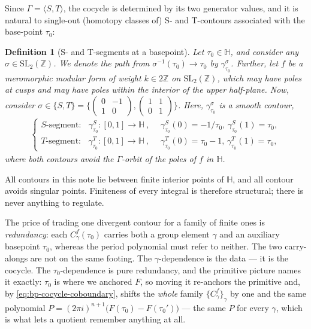 \documentclass[11pt]{article}
\newtheorem{definition}[theorem]{Definition}
\numberwithin{equation}{section}  %
\newcommand{\HH}{\mathbb{H}}
\newcommand{\ZZ}{\mathbb{Z}}
\newcommand{\SLZ}{\mathrm{SL}_2(\ZZ)}
\begin{document}
Since $\Gamma = \langle S, T\rangle$, the cocycle is determined by its two
generator values, and it is natural to single-out (homotopy classes of) S- and T-contours associated with 
the base-point $\tau_0$:%
 
\begin{definition}[S- and T-segments at a basepoint]\label{def:contours}
Let $\tau_0 \in \HH$, and consider any $\sigma \in \SLZ$. We denote the
path from $\sigma^{-1}(\tau_0) \to \tau_0$ by
$\gamma^\sigma_{\tau_0}$.
Further, let $f$ be a meromorphic modular form of weight $k \in 2\ZZ$ on
$\SLZ$, which may have poles at cusps and may have poles within the
interior of the upper half-plane.
Now, consider $\sigma \in \{ S, T \} = \{ \left( \begin{smallmatrix} 0 & -1 \\ 1 & 0 \end{smallmatrix}\right), \left( \begin{smallmatrix} 1 & 1 \\ 0 & 1 \end{smallmatrix}\right) \}$. Here, $\gamma^\sigma_{\tau_0}$ is a smooth contour,
\begin{align}
\begin{cases}
  S\text{-segment}\colon\:\:\; \gamma^S_{\tau_0}:[0, 1] \to \HH~,&~~
  \gamma^S_{\tau_0}(0)=-1/\tau_0,\, \gamma^S_{\tau_0}(1) =\tau_0,
  \\
  T\text{-segment}\colon\:\:\; \gamma^T_{\tau_0}:[0, 1] \to \HH~,&~~
  \gamma^T_{\tau_0}(0)=\tau_0-1,\, \gamma^T_{\tau_0}(1) =\tau_0,
\end{cases}
\label{eq:contour-pair}
\end{align}
where both contours avoid the $\Gamma$-orbit of the poles of $f$ in
$\HH$.
\end{definition}
 
All contours in this note lie between finite interior points of $\HH$, 
and all contour avoids singular points.  Finiteness of every integral is therefore 
structural; there is never anything to regulate.
 
The price of trading one divergent contour for a family of finite ones is
\emph{redundancy}: each $C^f_\gamma(\tau_0)$ carries both a group element
$\gamma$ and an auxiliary basepoint $\tau_0$, whereas the period polynomial
must refer to neither.  The two carry-alongs are not on the same footing.
The $\gamma$-dependence is the data --- it is the cocycle.  The
$\tau_0$-dependence is pure redundancy, and the primitive picture names it
exactly: $\tau_0$ is where we anchored $F$, so moving it re-anchors the
primitive and, by \eqref{eq:bp-cocycle-coboundary}, shifts the \emph{whole}
family $\{C^f_\gamma\}_\gamma$ by one and the same polynomial
$P = (2\pi i)^{n+1}\bigl(F(\tau_0)-F(\tau_0')\bigr)$ --- the same $P$ for
every $\gamma$, which is what lets a quotient remember anything at all.
\end{document}
